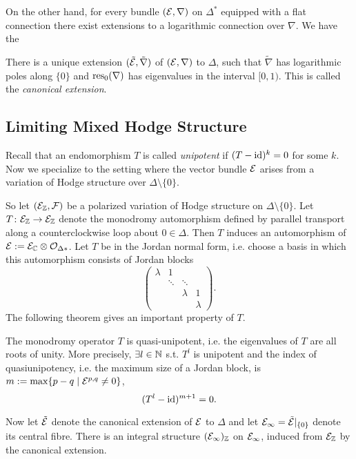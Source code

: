 \documentclass[../main.tex]{subfiles}
\begin{document}
On the other hand, for every bundle $(\mathcal{E}, \nabla)$ on $\Delta^*$ equipped with a flat connection there exist extensions to a logarithmic connection over $\nabla$.
We have the
\begin{lemdef} \textup{\cite[Prop. 11.3]{PS08}}
There is a unique extension $(\tilde{\mathcal{E}},\tilde{\nabla})$ of $(\mathcal{E},\nabla)$ to $\Delta$, such that $\tilde{\nabla}$ has logarithmic poles along $\{0\}$ and $\operatorname{res}_0(\nabla)$ has eigenvalues in the interval $[0,1)$.
This is called the \emph{canonical extension}.
\end{lemdef}


\subsection{Limiting Mixed Hodge Structure}

Recall that an endomorphism $T$ is called \emph{unipotent} if $(T-\operatorname{id})^k=0$ for some $k$.
Now we specialize to the setting where the vector bundle $\mathcal{E}$ arises from a variation of Hodge structure over $\Delta \setminus \{0\}$.

So let $(\mathcal{E}_{\mathbb{Z}},\mathcal{F})$ be a polarized variation of Hodge structure on $\Delta\setminus\{0\}$. 
Let $T\colon \mathcal{E}_{\mathbb{Z}} \to \mathcal{E}_{\mathbb{Z}}$ denote the monodromy automorphism defined by parallel transport along a counterclockwise loop about $0 \in \Delta$. Then $T$ induces an automorphism of $\mathcal{E} := \mathcal{E}_{\mathbb{C}} \otimes \mathcal{O}_{\Delta*}$. Let $T$ be in the Jordan normal form, i.e. choose a basis in which this automorphism consists of Jordan blocks
\[    
\begin{pmatrix}
\lambda & 1 &  &  \\ 
  & \ddots & \ddots & \\
   &  &  \lambda & 1\\
& & & \lambda
\end{pmatrix}.
\]
The following theorem gives an important property of $T$.

\begin{theorem} \label{monodromythm} \textup{\cite[Lemma 4.5, Thm. 6.1]{Sc73}} The monodromy operator $T$ is quasi-unipotent, i.e. the eigenvalues of $T$ are all roots of unity. More precisely, $\exists l \in \mathbb{N}$ s.t. $T^l$ is unipotent and the index of quasiunipotency, i.e. the maximum size of a Jordan block, is $m:=\max\{p-q\mid\mathcal{E}^{p,q}\neq 0\}$, 
\[(T^l-\operatorname{id})^{m+1}=0.\]
\end{theorem}

Now let  $\tilde{\mathcal{E}}$ denote the canonical extension of $\mathcal{E}$ to $\Delta$ and let $\mathcal{E}_\infty=\tilde{\mathcal{E}}|_{\{0\}}$ denote its central fibre. There is an integral structure $(\mathcal{E}_\infty)_{\mathbb{Z}}$ on $\mathcal{E}_\infty$, induced from $\mathcal{E}_{\mathbb{Z}}$ by the canonical extension. 
\end{document}
